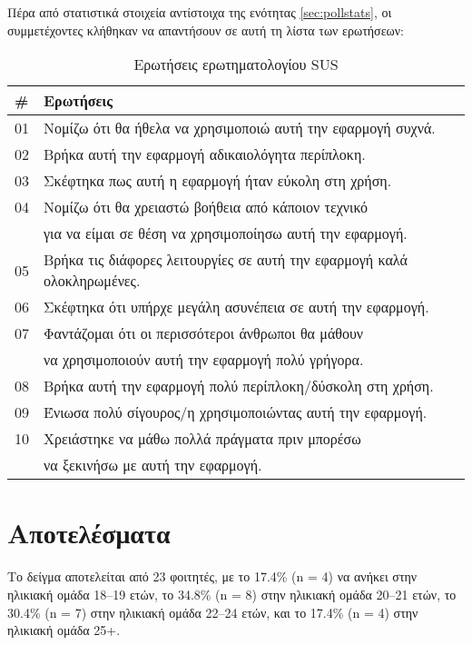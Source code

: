             Πέρα από στατιστικά στοιχεία αντίστοιχα της ενότητας \ref{sec:pollstats}, οι συμμετέχοντες κλήθηκαν να απαντήσουν σε αυτή τη λίστα των ερωτήσεων:

            \begin{table}[H] \noindent\centering\small
                \caption{Ερωτήσεις ερωτηματολογίου SUS}
                \begin{tabular}{l|l}
                    \# & \textbf{Ερωτήσεις} \\
                    \midrule
                    01 & Νομίζω ότι θα ήθελα να χρησιμοποιώ αυτή την εφαρμογή συχνά. \\
                    \midrule
                    02 & Βρήκα αυτή την εφαρμογή αδικαιολόγητα περίπλοκη. \\
                    \midrule
                    03 & Σκέφτηκα πως αυτή η εφαρμογή ήταν εύκολη στη χρήση. \\
                    \midrule
                    04 & Νομίζω ότι θα χρειαστώ βοήθεια από κάποιον τεχνικό \\
                      & για να είμαι σε θέση να χρησιμοποίησω αυτή την εφαρμογή. \\
                    \midrule
                    05 & Βρήκα τις διάφορες λειτουργίες σε αυτή την εφαρμογή καλά ολοκληρωμένες. \\
                    \midrule
                    06 & Σκέφτηκα ότι υπήρχε μεγάλη ασυνέπεια σε αυτή την εφαρμογή. \\
                    \midrule
                    07 & Φαντάζομαι ότι οι περισσότεροι άνθρωποι θα μάθουν \\
                      & να χρησιμοποιούν αυτή την εφαρμογή πολύ γρήγορα. \\
                    \midrule
                    08 & Βρήκα αυτή την εφαρμογή πολύ περίπλοκη/δύσκολη στη χρήση. \\
                    \midrule
                    09 & Ένιωσα πολύ σίγουρος/η χρησιμοποιώντας αυτή την εφαρμογή. \\
                    \midrule
                    10 & Χρειάστηκε να μάθω πολλά πράγματα πριν μπορέσω \\
                       & να ξεκινήσω με αυτή την εφαρμογή. \\
                \end{tabular}
                \label{tab:sus-questions}
            \end{table}

    \section{Αποτελέσματα}
        Το δείγμα αποτελείται από 23 φοιτητές, με το 17.4\% (n = 4) να ανήκει στην ηλικιακή ομάδα 18--19 ετών, το 34.8\% (n = 8) στην ηλικιακή ομάδα 20--21 ετών, το 30.4\% (n = 7) στην ηλικιακή ομάδα 22--24 ετών, και το 17.4\% (n = 4) στην ηλικιακή ομάδα 25+.

